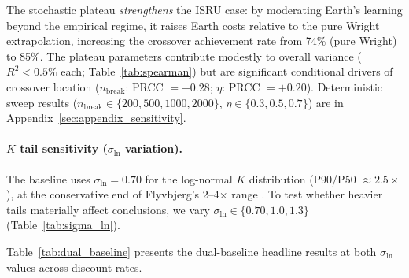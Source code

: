 \documentclass[5p,twocolumn]{elsarticle}
\begin{document}
The stochastic plateau \emph{strengthens} the ISRU case: by moderating Earth's learning beyond the empirical regime, it raises Earth costs relative to the pure Wright extrapolation, increasing the crossover achievement rate from 74\% (pure Wright) to 85\%. The plateau parameters contribute modestly to overall variance ($R^2 < 0.5\%$ each; Table~\ref{tab:spearman}) but are significant conditional drivers of crossover location ($n_{\mathrm{break}}$: PRCC $= +0.28$; $\eta$: PRCC $= +0.20$). Deterministic sweep results ($n_{\mathrm{break}} \in \{200,500,1000,2000\}$, $\eta \in \{0.3,0.5,0.7\}$) are in Appendix~\ref{sec:appendix_sensitivity}.

\paragraph{$K$ tail sensitivity ($\sigma_{\ln}$ variation).} The baseline uses $\sigma_{\ln} = 0.70$ for the log-normal $K$ distribution (P90/P50 $\approx 2.5\times$), at the conservative end of Flyvbjerg's 2--4$\times$ range \cite{flyvbjerg2014}. To test whether heavier tails materially affect conclusions, we vary $\sigma_{\ln} \in \{0.70, 1.0, 1.3\}$ (Table~\ref{tab:sigma_ln}).

\begin{table}[htbp]
\centering
\caption{$K$ tail sensitivity: effect of log-normal spread on crossover achievement (10{,}000 runs, $r = 5\%$, $H = 40{,}000$). \emph{Variant configuration}: $\sigma_{\ln}$ varied from canonical baseline (0.70). The [\$20B, \$200B] clip bounds truncate the heaviest tails at $\sigma_{\ln} \geq 1.0$.}
\label{tab:sigma_ln}
\small
{}
\end{table}

Table~\ref{tab:dual_baseline} presents the dual-baseline headline results at both $\sigma_{\ln}$ values across discount rates.
\end{document}
